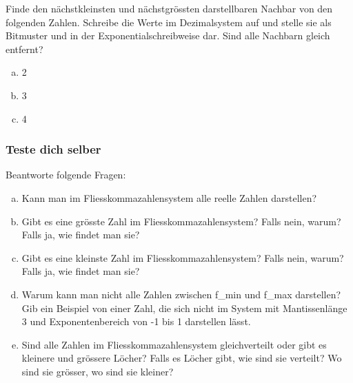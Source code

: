 \begin{aufgabe}
Finde den nächstkleinsten und nächstgrössten darstellbaren Nachbar von den folgenden Zahlen. Schreibe die Werte im Dezimalsystem auf und stelle sie als Bitmuster und in der Exponentialschreibweise dar. Sind alle Nachbarn gleich entfernt?
\begin{enumerate}[(a)]
\item 2
\item 3
\item 4
\end{enumerate}
\end{aufgabe}

\subsubsection*{\textcolor{blue-violet}{Teste dich selber}}

\begin{aufgabe}\label{fliesskommazahlen_kontrollfragen}
Beantworte folgende Fragen:
\begin{enumerate}[(a)]
\item Kann man im Fliesskommazahlensystem alle reelle Zahlen darstellen?
\item Gibt es eine grösste Zahl im Fliesskommazahlensystem? Falls nein, warum? Falls ja, wie findet man sie?
\item Gibt es eine kleinste Zahl im Fliesskommazahlensystem? Falls nein, warum? Falls ja, wie findet man sie?
\item Warum kann man nicht alle Zahlen zwischen f\_min und f\_max darstellen? Gib ein Beispiel von einer Zahl, die sich nicht im System mit Mantissenlänge 3 und Exponentenbereich von -1 bis 1 darstellen lässt.
\item Sind alle Zahlen im Fliesskommazahlensystem gleichverteilt oder gibt es kleinere und grössere Löcher? Falls es Löcher gibt, wie sind sie verteilt? Wo sind sie grösser, wo sind sie kleiner?
\end{enumerate}
\end{aufgabe}
